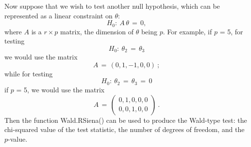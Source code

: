 \documentclass[a4paper,fleqn,11pt]{article}
\newcommand{\+}{\, + \,}
\newcommand{\sfn}[1]{\textsf{#1}}
\begin{document}
Now suppose that we wish to test another null hypothesis,
which can be represented as a linear constraint on $\theta$:
\[
H_0 : \ A\,\theta \,=\, 0 ,
\]
where $A$ is a $r \times p$ matrix, the dimension of $\theta$ being $p$.
For example, if $p$ = 5, for testing
\[
H_0 : \ \theta_2 \,=\, \theta_3
\]
we would use the matrix
\[
   A \,=\, (0, 1, -1, 0, 0) \ ;
\]
while for testing
\[
H_0 : \ \theta_2 \,=\, \theta_3 \,=\, 0
\]
if $p$ = 5, we would use the matrix
\[
   A \,=\, \left( \begin{array}{l} 0, 1, 0, 0, 0 \\
                                   0, 0, 1, 0, 0
                  \end{array} \right) \ .
\]
Then the function \sfn{Wald.RSiena()}
can be used to produce
the Wald-type test: the chi-squared value of the
test statistic, the number of degrees of freedom, and the $p$-value.

\end{document}
